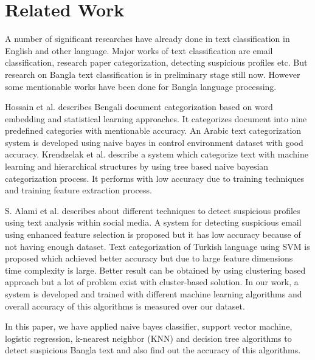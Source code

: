 \section{\textbf{Related Work}}
A number of significant researches have already done in text classification in English and other language. Major works of text classification are email classification, research paper categorization, detecting suspicious profiles etc.
But research on Bangla text classification is in preliminary stage still now. However some mentionable works have been done for Bangla language processing.
\vspace{0.2cm}

Hossain et al. describes Bengali document categorization based on word embedding and statistical learning approaches\cite{hossain2018automatic}. It categorizes document into nine predefined categories with mentionable accuracy. An Arabic text categorization system is developed using naive bayes in control environment dataset with good accuracy\cite{alsaleem2011automated}.
Krendzelak et al. describe a system which categorize text with machine learning and hierarchical structures by using tree based naive bayesian categorization process\cite{krendzelak2015text, chy2014bangla}. It performs with low accuracy due to training techniques and training feature extraction process.
\vspace{0.2cm}

S. Alami et al. describes about different techniques to detect suspicious profiles using text analysis within social media\cite{alami2015detecting}. A system for detecting suspicious email using enhanced feature selection is proposed but it has low accuracy because of not having enough dataset\cite{nizamani2013modeling}. Text categorization of Turkish language using SVM is proposed which achieved better accuracy but due to large feature dimensions time complexity is large\cite{kaya2012sentiment}. Better result can be obtained by using clustering based approach \cite{ismail2014bangla, ahmad2016bengali} but a lot of problem exist with cluster-based solution. In our work, a system is developed and trained with different machine learning algorithms and overall accuracy of this algorithms is measured over our dataset.\par
In this paper, we have applied naive bayes classifier\cite{yoo2015classification}, support vector machine\cite{wei2012text}, logistic regression\cite{sharma2015active}, k-nearest neighbor (KNN)\cite{harisinghaney2014text} and decision tree\cite{chavan2014survey} algorithms to detect suspicious Bangla text and also find out the accuracy of this algorithms.